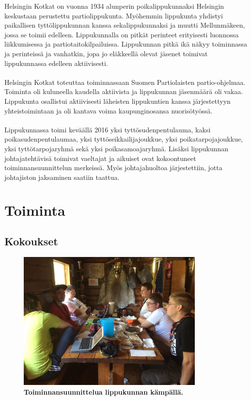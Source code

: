 \documentclass[a4paper, 12pt, finnish]{report} %
\begin{document}
Helsingin Kotkat on vuonna 1934 alunperin poikalippukunnaksi Helsingin keskustaan perustettu partiolippukunta. Myöhemmin lippukunta yhdistyi paikallisen tyttölippukunnan kanssa sekalippukunnaksi ja muutti Mellunmäkeen, jossa se toimii edelleen. Lippukunnalla on pitkät perinteet erityisesti luonnossa liikkumisessa ja partiotaitokilpailuissa. Lippukunnan pitkä ikä näkyy toiminnassa ja perinteissä ja vanhatkin, jopa jo eläkkeellä olevat jäsenet toimivat lippukunnassa edelleen aktiivisesti.\\
\\Helsingin Kotkat toteuttaa toiminnassaan Suomen Partiolaisten partio-ohjelmaa. Toiminta oli kuluneella kaudella aktiivista ja lippukunnan jäsenmäärä oli vakaa. Lippukunta osallistui aktiivisesti läheisten lippukuntien kanssa järjestettyyn yhteistoimintaan ja oli kantava voima kaupunginosansa nuorisötyössä.\\
\\Lippukunnassa toimi keväällä 2016 yksi tyttösudenpentulauma, kaksi poikasudenpentulaumaa, yksi tyttöseikkailijajoukkue, yksi poikatarpojajoukkue, yksi tyttötarpojaryhmä sekä yksi poikasamoajaryhmä. Lisäksi lippukunnan johtajatehtävisä toimivat vaeltajat ja aikuiset ovat kokoontuneet toiminnansuunnittelun merkeissä. Myös johtajahuoltoa järjestettiin, jotta johtajiston jaksaminen saatiin taattua. 
\newpage
\section{Toiminta}
\subsection{Kokoukset}

\begin{figure}[htb]
	\begin{center}
		\includegraphics[height=7cm]{kokous.jpg}
	\end{center}
	\captionsetup{labelformat=empty}
	\caption{\textbf{Toiminnansuunnittelua lippukunnan kämpällä.}}
\end{figure}
\end{document}
